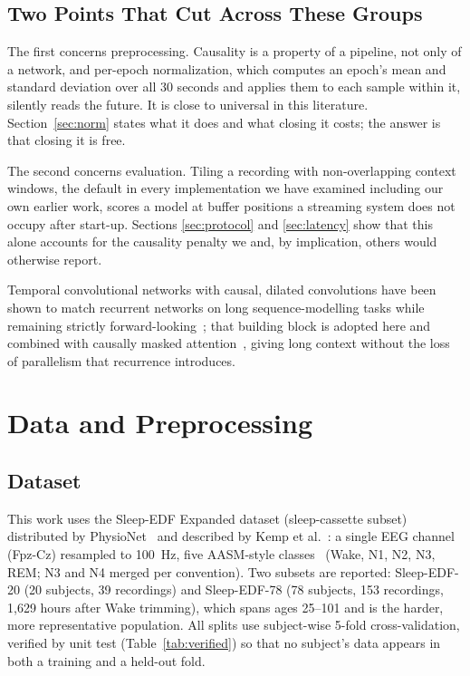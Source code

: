 \documentclass[conference]{IEEEtran}
\begin{document}
\subsection{Two Points That Cut Across These Groups}

The first concerns preprocessing. Causality is a property of a pipeline, not only of a
network, and per-epoch normalization, which computes an epoch's mean and standard deviation
over all 30 seconds and applies them to each sample within it, silently reads the future. It
is close to universal in this literature. Section~\ref{sec:norm} states what it does and what
closing it costs; the answer is that closing it is free.

The second concerns evaluation. Tiling a recording with non-overlapping context windows, the
default in every implementation we have examined including our own earlier work, scores a
model at buffer positions a streaming system does not occupy after start-up. Sections
\ref{sec:protocol} and \ref{sec:latency} show that this alone accounts for the causality
penalty we and, by implication, others would otherwise report.

Temporal convolutional networks with causal, dilated convolutions have been shown to match
recurrent networks on long sequence-modelling tasks while remaining strictly
forward-looking~\cite{tcn}; that building block is adopted here and combined with causally
masked attention~\cite{attention}, giving long context without the loss of parallelism that
recurrence introduces.

\section{Data and Preprocessing}

\subsection{Dataset}

This work uses the Sleep-EDF Expanded dataset (sleep-cassette subset) distributed by
PhysioNet~\cite{physionet} and described by Kemp et al.~\cite{kemp}: a single EEG channel
(Fpz-Cz) resampled to 100~Hz, five AASM-style classes~\cite{aasm} (Wake, N1, N2, N3, REM; N3
and N4 merged per convention). Two subsets are reported: Sleep-EDF-20 (20 subjects, 39
recordings) and Sleep-EDF-78 (78 subjects, 153 recordings, 1{,}629 hours after Wake
trimming), which spans ages 25--101 and is the harder, more representative population. All
splits use subject-wise 5-fold cross-validation, verified by unit test
(Table~\ref{tab:verified}) so that no subject's data appears in both a training and a
held-out fold.
\end{document}
